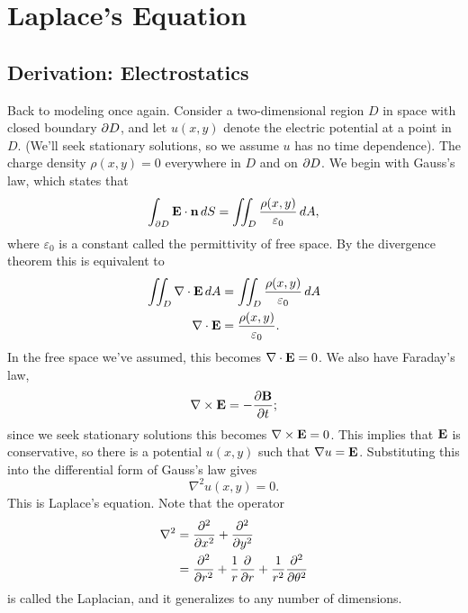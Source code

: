 \documentclass[../m180main.tex]{subfiles}
\begin{document}
\chapter{Laplace's Equation}
\section{Derivation: Electrostatics}
Back to modeling once again.
Consider a two-dimensional region $D$ in space with closed boundary $\partial D$, and let $u(x,y)$ denote the electric potential at a point in $D$.
(We'll seek stationary solutions, so we assume $u$ has no time dependence).
The charge density $\rho(x,y) = 0$ everywhere in $D$ and on $\partial D$.
We begin with Gauss's law, which states that
\[ \int_{\partial D} \mathbf{E} \cdot \mathbf{n} \,dS = \iint_D \frac{\rho(x,y)}{\varepsilon_0} \,dA, \]
where $\varepsilon_0$ is a constant called the permittivity of free space.
By the divergence theorem this is equivalent to
\begin{align*}
    \iint_D \nabla \cdot \mathbf{E} \,dA &= \iint_D \frac{\rho(x,y)}{\varepsilon_0} \,dA \\
    \nabla \cdot \mathbf{E} &= \frac{\rho(x,y)}{\varepsilon_0}.
\end{align*}
In the free space we've assumed, this becomes $\nabla \cdot \mathbf{E} = 0$.
We also have Faraday's law,
\[ \nabla \times \mathbf{E} = -\frac{\partial \mathbf{B}}{\partial t}; \]
since we seek stationary solutions this becomes $\nabla \times \mathbf{E} = 0$.
This implies that $\mathbf{E}$ is conservative, so there is a potential $u(x,y)$ such that $\nabla u = \mathbf{E}$.
Substituting this into the differential form of Gauss's law gives
\[ \nabla^2 u(x,y) = 0. \]
This is Laplace's equation.
Note that the operator
\begin{align*}
    \nabla^2 &= \frac{\partial^2}{\partial x^2} + \frac{\partial^2}{\partial y^2} \\
    &= \frac{\partial^2}{\partial r^2} + \frac{1}{r} \frac{\partial}{\partial r} + \frac{1}{r^2} \frac{\partial^2}{\partial \theta^2}
\end{align*}
is called the Laplacian, and it generalizes to any number of dimensions.
\end{document}

